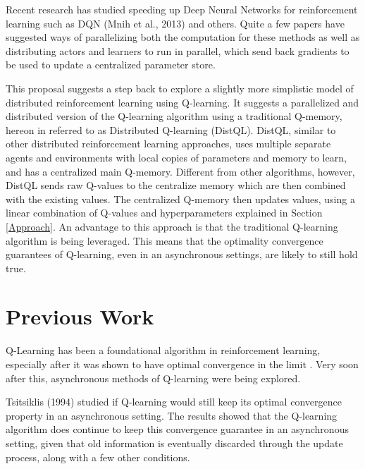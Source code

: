 \documentclass[jair,twoside,11pt,theapa]{article}
\begin{document}
Recent research has studied speeding up Deep Neural Networks for reinforcement learning such as DQN (Mnih et al., 2013)\nocite{Mnih2013} and others. Quite a few papers have suggested ways of parallelizing both the computation for these methods as well as distributing actors and learners to run in parallel, which send back gradients to be used to update a centralized parameter store. 

This proposal suggests a step back to explore a slightly more simplistic model of distributed reinforcement learning using Q-learning. It suggests a parallelized and distributed version of the Q-learning algorithm using a traditional Q-memory, hereon in referred to as Distributed Q-learning (DistQL). DistQL, similar to other distributed reinforcement learning approaches, uses multiple separate agents and environments with local copies of parameters and memory to learn, and has a centralized main Q-memory. Different from other algorithms, however, DistQL sends raw Q-values to the centralize memory which are then combined with the existing values. The centralized Q-memory then updates values, using a linear combination of Q-values and hyperparameters explained in Section \ref{Approach}. An advantage to this approach is that the traditional Q-learning algorithm is being leveraged. This means that the optimality convergence guarantees of Q-learning, even in an asynchronous settings, are likely to still hold true.


\section{Previous Work}
\label{Literature Survey}
Q-Learning \cite{watkins} has been a foundational algorithm in reinforcement learning, especially after it was shown to have optimal convergence in the limit \cite{qlearning}. Very soon after this, asynchronous methods of Q-learning were being explored.  

Tsitsiklis (1994) \nocite{Tsitsiklis1994} studied if Q-learning would still keep its optimal convergence property in an asynchronous setting. The results showed that the Q-learning algorithm does continue to keep this convergence guarantee in an asynchronous setting, given that old information is eventually discarded through the update process, along with a few other conditions. 
\end{document}
